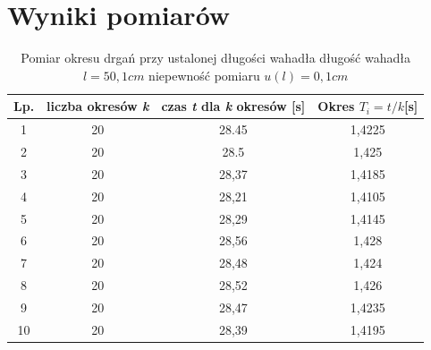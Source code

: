 \documentclass[a4paper,10pt,twoside]{article}
\begin{document}
	\newpage
	\section{Wyniki pomiarów}
	
	\begin{table}[!htbp]
		\caption{Pomiar okresu drgań przy ustalonej długości wahadła\newline
			 długość wahadła \hspace{60pt}$l=50,1cm$\newline
		 niepewność pomiaru  \hspace{40pt} $u(l) = 0,1cm$}
		\centering
		\def\arraystretch{1.4}
		\begin{tabular}{|c|c|c|c|}
			\hline
			Lp. & liczba okresów \textit{k} &  czas \textit{t} dla \textit{k} okresów [s] & Okres $T_i = t/k$[s] \\ \hline
			1 & 20 & 28.45 & 1,4225 \\ \hline
			2 & 20 & 28.5 & 1,425 \\ \hline
			3 & 20 & 28,37 & 1,4185 \\ \hline
			4 & 20 & 28,21 & 1,4105 \\ \hline
			5 & 20 & 28,29 & 1,4145\\ \hline
			6 & 20 & 28,56 & 1,428\\ \hline
			7 & 20 & 28,48 & 1,424\\ \hline
			8 & 20 & 28,52 & 1,426\\ \hline
			9 & 20 & 28,47 & 1,4235 \\ \hline
			10 & 20 & 28,39 & 1,4195\\ \hline
		
		\end{tabular}
	\end{table}
	
\end{document}
